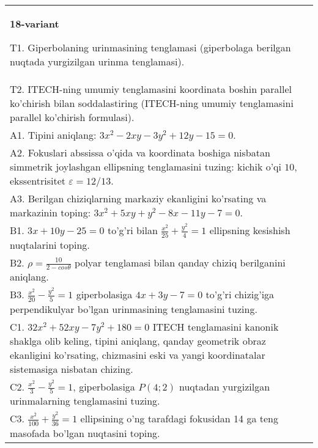 \documentclass{article}
\begin{document}
\begin{tabular}{m{17cm}}
\textbf{18-variant}
\newline

T1. Giperbolaning urinmasining tenglamasi (giperbolaga berilgan nuqtada yurgizilgan urinma tenglamasi).\\

T2. ITECH-ning umumiy tenglamasini koordinata boshin parallel ko'chirish bilan soddalastiring (ITECH-ning umumiy tenglamasini parallel ko'chirish formulasi).\\

A1. Tipini aniqlang: $3x^{2}-2xy-3y^{2}+12y-15=0$.\\

A2. Fokuslari abssissa o'qida va koordinata boshiga nisbatan simmetrik joylashgan ellipsning tenglamasini tuzing: kichik o'qi $10$, ekssentrisitet $\varepsilon=12/13$.\\

A3. Berilgan chiziqlarning markaziy ekanligini ko'rsating va markazinin toping: $3x^{2}+5xy+y^{2}-8x-11y-7=0$.\\

B1. $3x + 10y - 25 = 0$ to'g'ri bilan $\frac{x^{2}}{25} + \frac{y^{2}}{4} = 1$ ellipsning kesishish nuqtalarini toping.  \\

B2. $\rho = \frac{10}{2 - cos\theta}$ polyar tenglamasi bilan qanday chiziq berilganini aniqlang.  \\

B3. $\frac{x^{2}}{20} - \frac{y^{2}}{5} = 1$ giperbolasiga $4x + 3y - 7 = 0$ to'g'ri chizig'iga perpendikulyar bo'lgan urinmasining tenglamasini tuzing.  \\

C1. $32x^{2} + 52xy - 7y^{2} + 180 = 0$ ITECH tenglamasini kanonik shaklga olib keling, tipini aniqlang, qanday geometrik obraz ekanligini ko'rsating, chizmasini eski va yangi koordinatalar sistemasiga nisbatan chizing.  \\

C2. $\frac{x^{2}}{3} - \frac{y^{2}}{5} = 1$, giperbolasiga $P(4;2)$ nuqtadan yurgizilgan urinmalarning tenglamasini tuzing.  \\

C3. $\frac{x^{2}}{100} + \frac{y^{2}}{36} = 1$ ellipsining o'ng tarafdagi fokusidan 14 ga teng masofada bo'lgan nuqtasini toping.  \\

\end{tabular}
\vspace{1cm}
\end{document}
